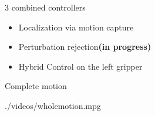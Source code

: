 \begin{frame}{3 combined controllers}
\begin{minipage}{0.3\textwidth}
\begin{itemize}
      \item Localization via motion capture
      \item {\footnotesize Perturbation rejection}\textbf{{\scriptsize (in progress)}}
    \end{itemize}
  \end{minipage}
%
{\color{txtcolor2}\vrule}
  \begin{minipage}{0.3\textwidth}
    \vspace*{-0.5cm}
    \begin{itemize}
    \item Hybrid Control on the left gripper
    \end{itemize}
  \end{minipage}
%
\end{frame}

%
%

\begin{frame}{Complete motion}
  \begin{center}
    {./videos/wholemotion.mpg}
  \end{center}
  \vspace*{-0.5cm}
\end{frame}